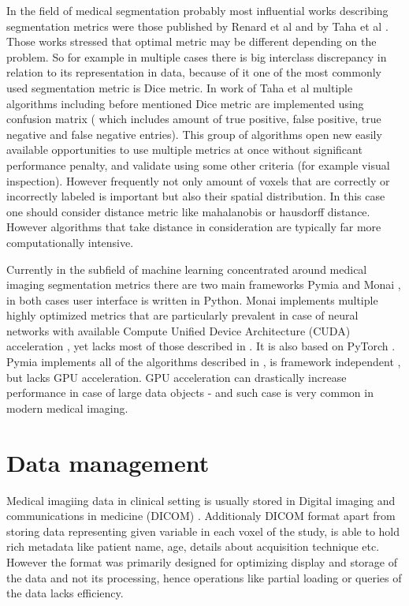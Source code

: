\documentclass[preprint,12pt]{elsarticle}
\begin{document}
In the field of medical segmentation probably most influential works describing segmentation metrics were those published by Renard et al \cite{Nature} and by Taha et al \cite{TahaMainSegm}. Those works stressed that optimal metric may be different depending on the problem. So for example in multiple cases there is big interclass discrepancy in relation to its representation in data, because of it one of the most commonly used segmentation metric is Dice metric. In work of Taha et al \cite{TahaMainSegm} multiple algorithms including before mentioned Dice metric are implemented using confusion matrix ( which includes amount of true positive, false positive, true negative and false negative entries). This group of algorithms open new easily available opportunities to use multiple metrics at once without significant performance penalty, and validate using some other criteria (for example visual inspection). However frequently not only amount of voxels that are correctly or incorrectly labeled is important but also their spatial distribution. In this case one should consider distance metric like mahalanobis or hausdorff distance.  However algorithms that take distance in consideration are typically far more computationally intensive.

Currently in the subfield of machine learning concentrated around medical imaging segmentation metrics there are two main frameworks Pymia \cite{Pymia} and Monai \cite{MONAI}, in both cases user interface is written in Python. Monai \cite{MONAI} implements multiple  highly optimized metrics that are particularly prevalent in case of neural networks with available Compute Unified Device Architecture (CUDA) acceleration , yet lacks most of those described in \cite{TahaMainSegm}. It is also based on PyTorch \cite{pytorch}. Pymia \cite{Pymia} implements all of the algorithms described in  \cite{TahaMainSegm}, is framework independent , but lacks GPU acceleration. GPU acceleration can drastically increase performance in case of large data objects - and such case is very common in modern medical imaging. 


\section{Data management}
Medical imagiing data in clinical setting is usually stored in Digital imaging and communications in medicine (DICOM)  \cite{dicom}. Additionaly DICOM format apart from storing data representing given variable in each voxel of the study, is able to hold rich metadata like patient name, age, details about acquisition technique etc.  However the format was primarily designed for optimizing display and storage of the data and not its processing, hence operations like partial loading or queries of the data lacks efficiency.
\end{document}
